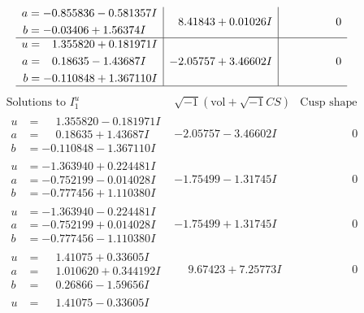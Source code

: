 \documentclass[1p]{elsarticle_modified}
\theoremstyle{definition}
\newcommand{\I}{\sqrt{-1}}
\begin{document}
$$\begin{array}{c|c|c}
\begin{aligned}
a &= -0.855836 - 0.581357 I \\
b &= -0.03406 + 1.56374 I\end{aligned}
 & \phantom{-}8.41843 + 0.01026 I & \phantom{-0.000000 } 0 \\ \hline\begin{aligned}
u &= \phantom{-}1.355820 + 0.181971 I \\
a &= \phantom{-}0.18635 - 1.43687 I \\
b &= -0.110848 + 1.367110 I\end{aligned}
 & -2.05757 + 3.46602 I & \phantom{-0.000000 } 0\\
 \hline 
 \end{array}$$\newpage$$\begin{array}{c|c|c}  
\text{Solutions to }I^u_{1}& \I (\text{vol} + \sqrt{-1}CS) & \text{Cusp shape}\\
 \hline 
\begin{aligned}
u &= \phantom{-}1.355820 - 0.181971 I \\
a &= \phantom{-}0.18635 + 1.43687 I \\
b &= -0.110848 - 1.367110 I\end{aligned}
 & -2.05757 - 3.46602 I & \phantom{-0.000000 } 0 \\ \hline\begin{aligned}
u &= -1.363940 + 0.224481 I \\
a &= -0.752199 - 0.014028 I \\
b &= -0.777456 + 1.110380 I\end{aligned}
 & -1.75499 - 1.31745 I & \phantom{-0.000000 } 0 \\ \hline\begin{aligned}
u &= -1.363940 - 0.224481 I \\
a &= -0.752199 + 0.014028 I \\
b &= -0.777456 - 1.110380 I\end{aligned}
 & -1.75499 + 1.31745 I & \phantom{-0.000000 } 0 \\ \hline\begin{aligned}
u &= \phantom{-}1.41075 + 0.33605 I \\
a &= \phantom{-}1.010620 + 0.344192 I \\
b &= \phantom{-}0.26866 - 1.59656 I\end{aligned}
 & \phantom{-}9.67423 + 7.25773 I & \phantom{-0.000000 } 0 \\ \hline\begin{aligned}
u &= \phantom{-}1.41075 - 0.33605 I \\

\end{aligned}
\end{array}$$
\end{document}
